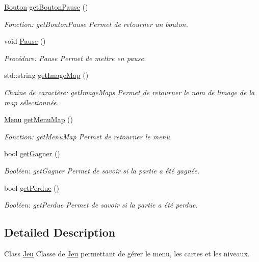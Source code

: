 \begin{DoxyCompactItemize}
\hyperlink{classBouton}{Bouton} \hyperlink{classJeu_a550a74e12dedc1170162141fa9356fb6}{get\+Bouton\+Pause} ()
\begin{DoxyCompactList}\small\item\em Fonction\+: get\+Bouton\+Pause Permet de retourner un bouton. \end{DoxyCompactList}\item 
void \hyperlink{classJeu_a825bd1ef8b91c70e468966f6985a2ee3}{Pause} ()
\begin{DoxyCompactList}\small\item\em Procédure\+: Pause Permet de mettre en pause. \end{DoxyCompactList}\item 
std\+::string \hyperlink{classJeu_a01d73851016ee4edb6742231d4084ad7}{get\+Image\+Map} ()
\begin{DoxyCompactList}\small\item\em Chaine de caractère\+: get\+Image\+Maps Permet de retourner le nom de l\textquotesingle{}image de la map sélectionnée. \end{DoxyCompactList}\item 
\hyperlink{classMenu}{Menu} \hyperlink{classJeu_a53db67d1ac9622db7f13297e398f2730}{get\+Menu\+Map} ()
\begin{DoxyCompactList}\small\item\em Fonction\+: get\+Menu\+Map Permet de retourner le menu. \end{DoxyCompactList}\item 
bool \hyperlink{classJeu_a1dee637787fc6976f2b504631780bf38}{get\+Gagner} ()
\begin{DoxyCompactList}\small\item\em Booléen\+: get\+Gagner Permet de savoir si la partie a été gagnée. \end{DoxyCompactList}\item 
bool \hyperlink{classJeu_a344c165558c9ab3aa815404179351156}{get\+Perdue} ()
\begin{DoxyCompactList}\small\item\em Booléen\+: get\+Perdue Permet de savoir si la partie a été perdue. \end{DoxyCompactList}\end{DoxyCompactItemize}


\subsection{Detailed Description}
Class \hyperlink{classJeu}{Jeu} Classe de \hyperlink{classJeu}{Jeu} permettant de gérer le menu, les cartes et les niveaux. 


